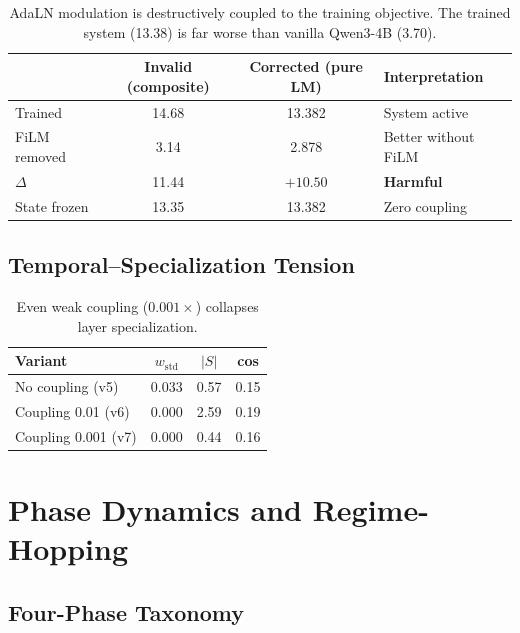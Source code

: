 \documentclass[11pt,a4paper]{article}
\begin{document}
\begin{table}[h]
\centering
\begin{tabular}{lccl}
\toprule
& \textbf{Invalid (composite)} & \textbf{Corrected (pure LM)} & \textbf{Interpretation} \\
\midrule
Trained       & 14.68 & 13.382 & System active \\
FiLM removed  & 3.14  & 2.878  & Better without FiLM \\
$\Delta$      & 11.44 & $+10.50$ & \textbf{Harmful} \\
State frozen  & 13.35 & 13.382 & Zero coupling \\
\bottomrule
\end{tabular}
\caption{AdaLN modulation is destructively coupled to the training objective.
The trained system (13.38) is far worse than vanilla Qwen3-4B (3.70).}
\end{table}

\subsection*{Temporal--Specialization Tension}

\begin{table}[h]
\centering
\begin{tabular}{lccc}
\toprule
\textbf{Variant} & $w_\mathrm{std}$ & $|S|$ & \textbf{cos} \\
\midrule
No coupling (v5)       & 0.033 & 0.57 & 0.15 \\
Coupling 0.01 (v6)     & 0.000 & 2.59 & 0.19 \\
Coupling 0.001 (v7)    & 0.000 & 0.44 & 0.16 \\
\bottomrule
\end{tabular}
\caption{Even weak coupling ($0.001\times$) collapses layer specialization.}
\end{table}

\section{Phase Dynamics and Regime-Hopping}
\label{app:dynamics}

\subsection*{Four-Phase Taxonomy}
\end{document}
